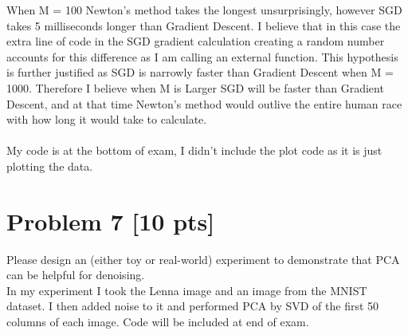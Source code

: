 \documentclass[11pt]{article}
\begin{document}
When M = 100 Newton's method takes the longest unsurprisingly, however SGD takes 5 milliseconds longer than Gradient Descent. I believe that in this case the extra line of code in the SGD gradient calculation creating a random number accounts for this difference as I am calling an external function. This hypothesis is further justified as SGD is narrowly faster than Gradient Descent when M = 1000. Therefore I believe when M is Larger SGD will be faster than Gradient Descent, and at that time Newton's method would outlive the entire human race with how long it would take to calculate. \\\\

My code is at the bottom of exam, I didn't include the plot code as it is just plotting the data. 
\newpage
\section*{Problem 7 [10 pts]}
Please design an (either toy or real-world) experiment  to demonstrate that PCA can be helpful for denoising.\\
In my experiment I took the Lenna image and an image from the MNIST dataset. I then added noise to it and performed PCA by SVD of the first 50 columns of each image. Code will be included at end of exam. \\
\end{document}
